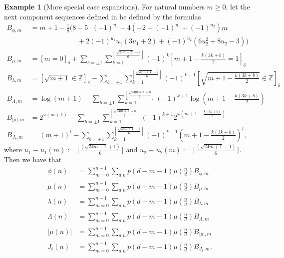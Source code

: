 \documentclass[12pt,reqno,a4letter]{article}
\numberwithin{figure}{section}
\numberwithin{table}{section}
\numberwithin{equation}{section}
\newcommand{\Iverson}[1]{\ensuremath{\left[#1\right]_{\delta}}}
\theoremstyle{plain}
\numberwithin{theorem}{section}
\theoremstyle{definition}
\newtheorem{example}[theorem]{Example}
\begin{document}
\begin{example}[More special case expansions]
\label{cor_ExactFormulas_SpArithFns} 
For natural numbers $m \geq 0$, let the next component sequences 
defined in \cite{AA,MERCA-SCHMIDT-RAMJ} be defined by the formulas 
\begin{align*} 
B_{\phi,m} & = m+1 - \frac{1}{8}\Biggl(8 - 5 \cdot (-1)^{u_1} - 4 \left( 
     -2 + (-1)^{u_1} + (-1)^{u_2}\right) m \\ 
     & \phantom{=m+1 - \frac{1}{8}\Biggl(8\ } + 
     2 (-1)^{u_1} u_1 (3u_1+2) + 
     (-1)^{u_2} (6u_2^2+8u_2-3)\Biggr) \\ 
B_{\mu, m} & = \Iverson{m = 0} + \sum_{b = \pm 1} 
     \sum_{k=1}^{\left\lfloor \frac{\sqrt{24m+25}-b}{6} \right\rfloor} 
     (-1)^k \Iverson{m+1-\frac{k(3k+b)}{2} = 1} \\ 
B_{\lambda, m} & = 
     \Iverson{\sqrt{m+1} \in \mathbb{Z}} - \sum_{b = \pm 1} 
     \sum_{k=1}^{\left\lfloor \frac{\sqrt{24m+1}-b}{6} \right\rfloor} 
     (-1)^{k+1} \Iverson{\sqrt{m+1-\frac{k(3k+b)}{2}} \in \mathbb{Z}} \\ 
B_{\Lambda, m} & = 
     \log(m+1) - \sum_{b = \pm 1} 
     \sum_{k=1}^{\left\lfloor \frac{\sqrt{24m+1}-b}{6} \right\rfloor} 
     (-1)^{k+1} \log\left(m+1-\frac{k(3k+b)}{2}\right) \\ 
B_{|\mu|, m} & = 
     2^{\omega(m+1)} - \sum_{b = \pm 1} 
     \sum_{k=1}^{\left\lfloor \frac{\sqrt{24m+1}-b}{6} \right\rfloor} 
     (-1)^{k+1} 2^{\omega\left(m+1-\frac{k(3k+b)}{2}\right)} \\ 
B_{J_t, m} & = 
     (m+1)^t - \sum_{b = \pm 1} 
     \sum_{k=1}^{\left\lfloor \frac{\sqrt{24m+1}-b}{6} \right\rfloor} 
     (-1)^{k+1} \left(m+1-\frac{k(3k+b)}{2}\right)^t, 
\end{align*} 
where $u_1 \equiv u_1(m) := \lfloor \frac{\left(\sqrt{24m+1}+1\right)}{6} \rfloor$ and 
$u_2 \equiv u_2(m) := \lfloor \frac{\left(\sqrt{24m+1}-1\right)}{6} \rfloor$. 
Then we have that 
\begin{align*} 
\phi(n) & = \sum_{m=0}^{n-1} \sum_{d|n} p(d-m-1) \mu\left(\frac{n}{d}\right) B_{\phi,m} \\ 
\mu(n) & = \sum_{m=0}^{n-1} \sum_{d|n} p(d-m-1) \mu\left(\frac{n}{d}\right) B_{\mu,m} \\ 
\lambda(n) & = \sum_{m=0}^{n-1} \sum_{d|n} p(d-m-1) \mu\left(\frac{n}{d}\right) B_{\lambda,m} \\ 
\Lambda(n) & = \sum_{m=0}^{n-1} \sum_{d|n} p(d-m-1) \mu\left(\frac{n}{d}\right) B_{\Lambda,m} \\ 
|\mu(n)| & = \sum_{m=0}^{n-1} \sum_{d|n} p(d-m-1) \mu\left(\frac{n}{d}\right) B_{|\mu|,m} \\ 
J_t(n) & = \sum_{m=0}^{n-1} \sum_{d|n} p(d-m-1) \mu\left(\frac{n}{d}\right) B_{J_t,m}. 
\end{align*}
\end{example} 
\end{document}
